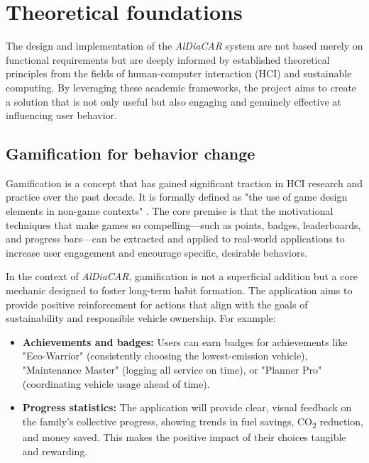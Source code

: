 \section{Theoretical foundations}

The design and implementation of the \textit{AlDiaCAR} system are not based merely on functional requirements but are deeply informed by established theoretical principles from the fields of human-computer interaction (HCI) and sustainable computing. By leveraging these academic frameworks, the project aims to create a solution that is not only useful but also engaging and genuinely effective at influencing user behavior.

\subsection{Gamification for behavior change}
Gamification is a concept that has gained significant traction in HCI research and practice over the past decade. It is formally defined as "the use of game design elements in non-game contexts" \cite{deterding2011gamification}. The core premise is that the motivational techniques that make games so compelling—such as points, badges, leaderboards, and progress bars—can be extracted and applied to real-world applications to increase user engagement and encourage specific, desirable behaviors.

\textgap

In the context of \textit{AlDiaCAR}, gamification is not a superficial addition but a core mechanic designed to foster long-term habit formation. The application aims to provide positive reinforcement for actions that align with the goals of sustainability and responsible vehicle ownership. For example:
\begin{itemize}
    \item \textbf{Achievements and badges:} Users can earn badges for achievements like "Eco-Warrior" (consistently choosing the lowest-emission vehicle), "Maintenance Master" (logging all service on time), or "Planner Pro" (coordinating vehicle usage ahead of time).
    \item \textbf{Progress statistics:} The application will provide clear, visual feedback on the family's collective progress, showing trends in fuel savings, CO\textsubscript{2} reduction, and money saved. This makes the positive impact of their choices tangible and rewarding.
\end{itemize}

\textgap

